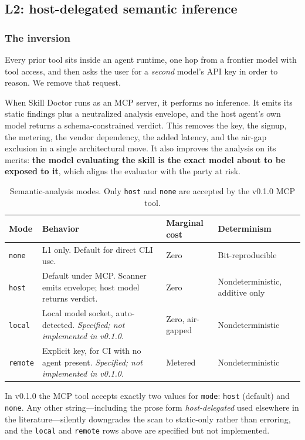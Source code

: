 \documentclass[11pt]{article}
\begin{document}
\subsection{L2: host-delegated semantic inference}
\label{sec:l2}

\subsubsection{The inversion}

Every prior tool sits inside an agent runtime, one hop from a frontier model
with tool access, and then asks the user for a \emph{second} model's API key in
order to reason. We remove that request.

When Skill Doctor runs as an MCP server, it performs no inference. It emits its
static findings plus a neutralized analysis envelope, and the host agent's own
model returns a schema-constrained verdict. This removes the key, the signup,
the metering, the vendor dependency, the added latency, and the air-gap
exclusion in a single architectural move. It also improves the analysis on its
merits: \textbf{the model evaluating the skill is the exact model about to be
exposed to it}, which aligns the evaluator with the party at risk.

\begin{table}[htbp]
  \centering
  \caption{Semantic-analysis modes. Only \texttt{host} and \texttt{none} are
  accepted by the v0.1.0 MCP tool.}
  \label{tab:modes}
  \small
  \begin{tabularx}{\textwidth}{lXll}
    \toprule
    Mode & Behavior & Marginal cost & Determinism \\
    \midrule
    \texttt{none} & L1 only. Default for direct CLI use.
      & Zero & Bit-reproducible \\
    \texttt{host} & Default under MCP. Scanner emits envelope; host model
      returns verdict. & Zero & Nondeterministic, additive only \\
    \texttt{local} & Local model socket, auto-detected.
      \emph{Specified; not implemented in v0.1.0.} & Zero, air-gapped
      & Nondeterministic \\
    \texttt{remote} & Explicit key, for CI with no agent present.
      \emph{Specified; not implemented in v0.1.0.} & Metered
      & Nondeterministic \\
    \bottomrule
  \end{tabularx}
\end{table}

In v0.1.0 the MCP tool accepts exactly two values for \texttt{mode}:
\texttt{host} (default) and \texttt{none}. Any other string---including the
prose form \emph{host-delegated} used elsewhere in the literature---silently
downgrades the scan to static-only rather than erroring, and the
\texttt{local} and \texttt{remote} rows above are specified but not
implemented.
\end{document}
